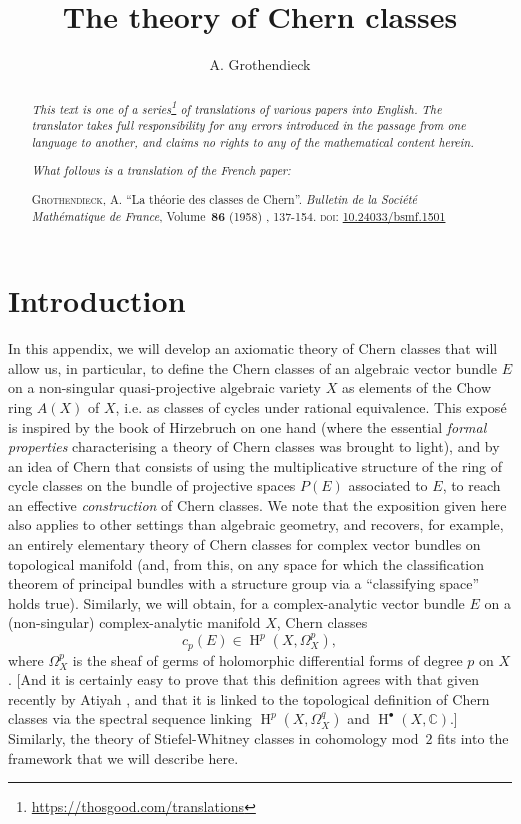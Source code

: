 \documentclass{article}
\title{The theory of Chern classes}
\author{A. Grothendieck}
\date{}
\newcommand{\doctype}{French paper}
\newcommand{\origcit}{%
  \textsc{Grothendieck, A.}
  ``La th\'{e}orie des classes de Chern''.
  \emph{Bulletin de la Soci\'{e}t\'{e} Math\'{e}matique de France}, Volume~\textbf{86} (1958) , 137-154.
  \textsc{doi}: \href{https://www.doi.org/10.24033/bsmf.1501}{10.24033/bsmf.1501}%
}
\DeclareMathOperator{\HH}{H}
\newcommand{\oldpage}[1]{\marginpar{\footnotesize$\Big\vert$ \textit{p.~#1}}}
\begin{document}
\maketitle
\thispagestyle{fancy}

\renewcommand{\abstractname}{Translator's note.}

\begin{abstract}
  \renewcommand*{\thefootnote}{\fnsymbol{footnote}}
  \emph{This text is one of a series\footnote{\url{https://thosgood.com/translations}} of translations of various papers into English.}
  \emph{The translator takes full responsibility for any errors introduced in the passage from one language to another, and claims no rights to any of the mathematical content herein.}

  \medskip
  
  \emph{What follows is a translation of the \doctype:}

  \medskip\noindent
  \origcit
\end{abstract}

\setcounter{footnote}{0}

\tableofcontents





\section*{Introduction}

\oldpage{137}
In this appendix, we will develop an axiomatic theory of Chern classes that will allow us, in particular, to define the Chern classes of an algebraic vector bundle $E$ on a non-singular quasi-projective algebraic variety $X$ as elements of the Chow ring $A(X)$ of $X$, i.e. as classes of cycles under rational equivalence.
This expos\'{e} is inspired by the book of Hirzebruch on one hand (where the essential \emph{formal properties} characterising a theory of Chern classes was brought to light), and by an idea of Chern \cite{2} that consists of using the multiplicative structure of the ring of cycle classes on the bundle of projective spaces $P(E)$ associated to $E$, to reach an effective \emph{construction} of Chern classes.
We note that the exposition given here also applies to other settings than algebraic geometry, and recovers, for example, an entirely elementary theory of Chern classes for complex vector bundles on topological manifold (and, from this, on any space for which the classification theorem of principal bundles with a structure group via a ``classifying space'' holds true).
Similarly, we will obtain, for a complex-analytic vector bundle $E$ on a (non-singular) complex-analytic manifold $X$, Chern classes
\[
  c_p(E) \in \HH^p(X,\Omega_X^p),
\]
where $\Omega_X^p$ is the sheaf of germs of holomorphic differential forms of degree $p$ on $X$.
[And it is certainly easy to prove that this definition agrees with that given recently by Atiyah \cite{1}, and that it is linked to the topological definition of Chern classes via the spectral sequence linking $\HH^p(X,\Omega_X^q)$ and $\HH^\bullet(X,\mathbb{C})$.]
Similarly, the theory of
\oldpage{138}
Stiefel-Whitney classes in cohomology mod~$2$ fits into the framework that we will describe here.
\end{document}
